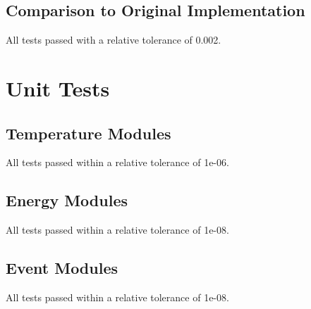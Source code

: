 \documentclass[12pt]{article}
\begin{document}
\subsection{Comparison to Original Implementation}
All tests passed with a relative tolerance of 0.002.


\section{Unit Tests}

\subsection{Temperature Modules}
All tests passed within a relative tolerance of 1e-06.

\subsection{Energy Modules}
All tests passed within a relative tolerance of 1e-08.

\subsection{Event Modules} 
All tests passed within a relative tolerance of 1e-08.
\end{document}
